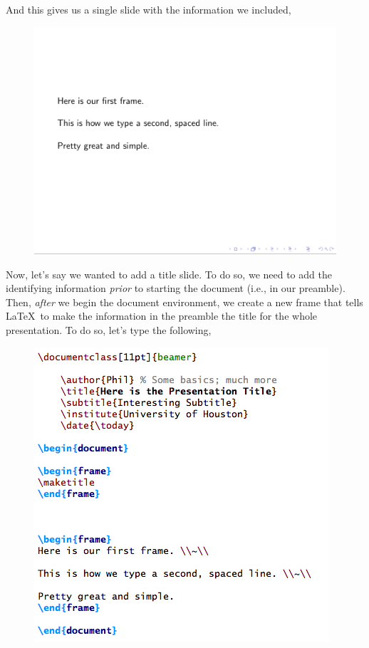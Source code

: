 \documentclass[11pt]{article}
\begin{document}
And this gives us a single slide with the information we included,

\begin{figure}[!h]
	\includegraphics[scale=.5]{OUT2}
	\centering
\end{figure}

\newpage

Now, let's say we wanted to add a title slide. To do so, we need to add the identifying information \textit{prior} to starting the document (i.e., in our preamble). Then, \textit{after} we begin the document environment, we create a new frame that tells \LaTeX\ to make the information in the preamble the title for the whole presentation. To do so, let's type the following,

\begin{figure}[!h]
	\includegraphics[scale=.5]{CODE3}
	\centering
\end{figure}
\end{document}
